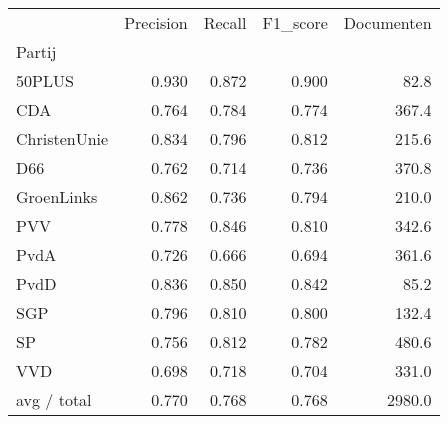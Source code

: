 \begin{tabular}{lrrrr}
\toprule
{} &  Precision &  Recall &  F1\_score &  Documenten \\
Partij       &            &         &           &             \\
\midrule
50PLUS       &      0.930 &   0.872 &     0.900 &        82.8 \\
   CDA       &      0.764 &   0.784 &     0.774 &       367.4 \\
ChristenUnie &      0.834 &   0.796 &     0.812 &       215.6 \\
   D66       &      0.762 &   0.714 &     0.736 &       370.8 \\
  GroenLinks &      0.862 &   0.736 &     0.794 &       210.0 \\
   PVV       &      0.778 &   0.846 &     0.810 &       342.6 \\
  PvdA       &      0.726 &   0.666 &     0.694 &       361.6 \\
  PvdD       &      0.836 &   0.850 &     0.842 &        85.2 \\
   SGP       &      0.796 &   0.810 &     0.800 &       132.4 \\
    SP       &      0.756 &   0.812 &     0.782 &       480.6 \\
   VVD       &      0.698 &   0.718 &     0.704 &       331.0 \\
 avg / total &      0.770 &   0.768 &     0.768 &      2980.0 \\
\bottomrule
\end{tabular}
